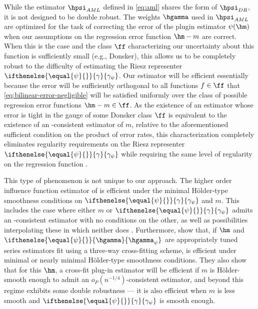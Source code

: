 \documentclass[aos,submission]{imsart}
\theoremstyle{plain}
\theoremstyle{remark}
\newcommand{\riesz}[1][]{\ifthenelse{\equal{#1}{}}{\gamma}{\gamma_{{#1}}}}
\newcommand{\hriesz}[1][]{\ifthenelse{\equal{#1}{}}{\hgamma}{\hgamma_{{#1}}}}
\begin{document}
While the estimator $\hpsi_{AML}$ defined in \eqref{eq:aml} shares the form of $\hpsi_{DR}$, it is not designed to be double robust.
The weights $\hgamma$ used in $\hpsi_{AML}$ are optimized for the task of correcting the error of the plugin estimator 
$\psi(\hm)$ when our assumptions on the regression error function $\hm - m$ are correct. When this is the case and the class $\ff$ 
characterizing our uncertainty about this function is sufficiently small (e.g., Donsker), this allows us to be completely robust
to the difficulty of estimating the Riesz representer $\riesz[\psi]$. Our estimator will be efficient essentially because 
the error \smash{$\hriesz-\gamma_{\psi}$} will be sufficiently orthogonal to all functions $f \in \ff$ 
that \eqref{eq:bilinear-error-negligible} will be satisfied uniformly over the class
of possible regression error functions $\hm - m \in \ff$.
As the existence of an estimator \smash{$\hm$}
whose error  is tight in the gauge of some Donsker class $\ff$
is equivalent to the existence of an -consistent estimator of $m$,
relative to the aforementioned sufficient condition on the product of error rates, 
this characterization completely eliminates regularity requirements on the Riesz representer $\riesz[{\psi}]$ 
while requiring the same level of regularity on the regression function . 

This type of phenomenon is not unique to our approach. The higher order influence function estimator of \citet{mukherjee2017semiparametric} 
is efficient under the minimal H\"older-type smoothness conditions on $\riesz[\psi]$ and $m$. This includes the case
where either $m$ or $\riesz[\psi]$ admits an -consistent estimator with no conditions on the other,
as well as possibilities interpolating these in which neither does \citep{robins2009semiparametric}.
Furthermore, \citet{newey2018cross} show that, if $\hm$ and $\hriesz[\psi]$ are 
appropriately tuned series estimators fit using a three-way cross-fitting scheme,   is efficient under 
minimal or nearly minimal H\"older-type smoothness conditions. They also show that 
for this $\hm$, a cross-fit plug-in estimator  will
be efficient if $m$ is H\"older-smooth enough to admit an $o_P(n^{-1/4})$-consistent estimator, and 
beyond this regime exhibits some double robustness --- 
it is also efficient when $m$ is less smooth and $\riesz[\psi]$ is smooth enough.
\end{document}
